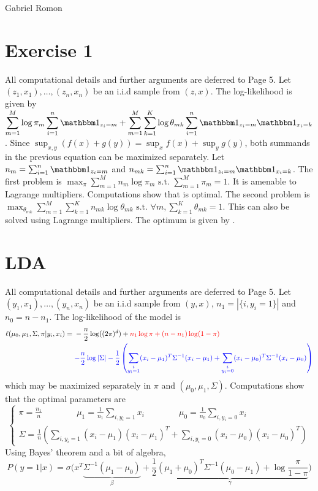\documentclass[a4paper,11pt]{article}
\begin{document}
\noindent Gabriel Romon
\section*{Exercise 1}
All computational details and further arguments are deferred to Page 5.
Let $(z_1,x_1),\ldots,(z_n,x_n)$ be an i.i.d sample from $(z,x)$.
The log-likelihood is given by $\displaystyle \sum_{m=1}^M \log \pi_m \sum_{i=1}^n \mathbbm 1_{z_i=m} + \sum_{m=1}^M \sum_{k=1}^K \log \theta_{mk} \sum_{i=1}^n \mathbbm 1_{z_i=m}\mathbbm 1_{x_i=k}$.
Since $\sup_{x,y}(f(x)+g(y)) = \sup_x f(x) + \sup_y g(y)$, both summands in the previous equation can be maximized separately. Let $n_m=\sum_{i=1}^n \mathbbm 1_{z_i=m}$ and $n_{mk}=\sum_{i=1}^n \mathbbm 1_{z_i=m}\mathbbm 1_{x_i=k}$.\newline \newline
The first problem is $\max_{\pi} \sum_{m=1}^M n_m\log \pi_m \text{ s.t. } \sum_{m=1}^M \pi_m = 1$. It is amenable to Lagrange multipliers. Computations show that  is optimal. \newline
The second problem is $\max_{\theta_{mk}} \sum_{m=1}^M \sum_{k=1}^K n_{mk}\log \theta_{mk} \text{ s.t. } \forall m, \sum_{k=1}^K \theta_{mk} = 1$. This can also be solved using Lagrange multipliers. The optimum is given by .

\section*{LDA}
All computational details and further arguments are deferred to Page 5. Let $(y_1,x_1),\ldots,(y_n,x_n)$ be an i.i.d sample from $(y,x)$, $n_1=|\{i, y_i=1\}|$ and $n_0=n-n_1$. The log-likelihood of the model is $$\ell(\mu_0,\mu_1,\Sigma,\pi|y_i,x_i) = \begin{aligned}[t]&-\frac n2 \log((2\pi)^d)+ \color{red}{n_1\log \pi +(n-n_1)\log(1-\pi)}\\ &\color{blue}{-\frac n2 \log |\Sigma| -\frac 12 \left( \sum_{\substack{i\\y_i=1}}(x_i-\mu_1)^T\Sigma^{-1}(x_i-\mu_1) + \sum_{\substack{i\\y_i=0}}(x_i-\mu_0)^T\Sigma^{-1}(x_i-\mu_0)\right)}\end{aligned}$$
which may be maximized separately in $\pi$ and $(\mu_0,\mu_1,\Sigma)$. Computations show that the optimal parameters are $$\begin{cases}
  \pi = \frac{n_1}n\quad \quad \quad \quad\mu_1= \frac{1}{n_1}\sum_{i,y_i=1} x_i \quad \quad \quad \quad \mu_0 = \frac{1}{n_0}\sum_{i,y_i=0} x_i\\
  \Sigma = \frac 1n\left(\sum_{i,y_i=1} (x_i-\mu_1)(x_i-\mu_1)^T+\sum_{i,y_i=0} (x_i-\mu_0)(x_i-\mu_0)^T \right)
\end{cases}$$
Using Bayes' theorem and a bit of algebra, $$P(y=1|x)=\sigma\bigg(x^T\underbrace{\Sigma^{-1}(\mu_1-\mu_0)}_{\beta} + \underbrace{\frac12(\mu_1+\mu_0)^T\Sigma^{-1}(\mu_0-\mu_1)+\log \frac{\pi}{1-\pi}}_{\gamma}\bigg)$$
\end{document}
